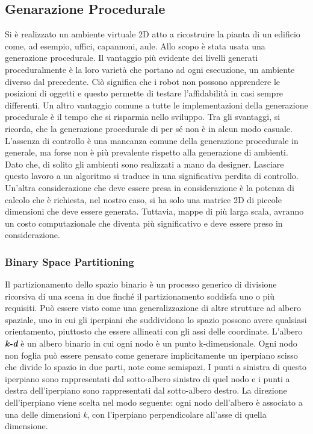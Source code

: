 \subsection{Genarazione Procedurale}
\label{ssec:generazioneproc}
Si è realizzato un ambiente virtuale 2D atto a ricostruire
la pianta di un edificio come, ad esempio, uffici, capannoni, aule. Allo scopo
è stata usata una generazione procedurale.
Il vantaggio più evidente dei livelli generati proceduralmente è la loro varietà
che portano ad ogni esecuzione, un ambiente diverso dal precedente.
Ciò significa che i robot non possono apprendere le posizioni di oggetti e
questo permette di testare l'affidabilità in casi sempre differenti.
Un altro vantaggio comune a tutte le implementazioni della generazione
procedurale è il tempo che si risparmia nello sviluppo.
Tra gli svantaggi, si ricorda, che la generazione procedurale di per sé non è
in alcun modo casuale.
L'assenza di controllo è una mancanza comune della generazione procedurale in
generale, ma forse non è più prevalente rispetto alla generazione di ambienti.
Dato che, di solito gli ambienti sono realizzati a mano da designer.
Lasciare questo lavoro a un algoritmo si traduce in una significativa perdita di
controllo.
Un'altra considerazione che deve essere presa in considerazione è la potenza di
calcolo che è richiesta, nel nostro caso, si ha solo una matrice 2D di piccole
dimensioni che deve essere generata. Tuttavia, mappe di più larga scala, avranno
un costo computazionale che diventa più significativo e deve essere preso in
considerazione.\cite{green2016procedural}

\subsubsection{Binary Space Partitioning}
\label{sssec:binaryspace}
Il partizionamento dello spazio binario è un processo generico di divisione
ricorsiva di una scena in due finché il partizionamento soddisfa uno o più
requisiti.
Può essere visto come una generalizzazione di altre strutture ad albero spaziale,
uno in cui gli iperpiani che suddividono lo spazio possono avere qualsiasi
orientamento, piuttosto che essere allineati con gli assi delle coordinate.\cite{wiki:bsp}
L'albero \textbf{\emph{k-d}} è un albero binario in cui ogni nodo è un punto
k-dimensionale. Ogni nodo non foglia può essere pensato come generare
implicitamente un iperpiano scisso che divide lo spazio in due parti, note come
semispazi. I punti a sinistra di questo iperpiano sono rappresentati dal
sotto-albero sinistro di quel nodo e i punti a destra dell'iperpiano sono
rappresentati dal sotto-albero destro. La direzione dell'iperpiano viene scelta
nel modo seguente: ogni nodo dell'albero è associato a una delle dimensioni \emph{k},
con l'iperpiano perpendicolare all'asse di quella dimensione.\cite{wiki:kdtree}

